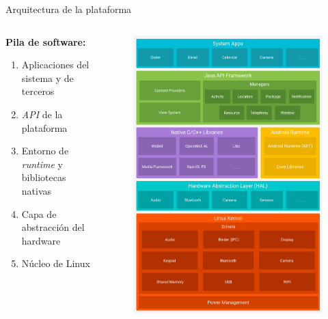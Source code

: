 \documentclass[pdf]{beamer} %
\begin{document}
\begin{frame}{Arquitectura de la plataforma}
    \begin{columns}
        \begin{column}{.6\textwidth}
            \textbf{Pila de software:}
            \begin{enumerate}
                \item Aplicaciones del sistema y de terceros
                \item \textit{API} de la plataforma
                \item Entorno de \textit{runtime} y bibliotecas nativas
                \item Capa de abstracción del hardware
                \item Núcleo de Linux
            \end{enumerate}
        \end{column}

        \begin{column}{.4\textwidth}
            \begin{figure}
                \includegraphics[scale=0.09]{../imagenes/android-stack.png}
            \end{figure}
        \end{column}
    \end{columns}
\end{frame}
\end{document}
